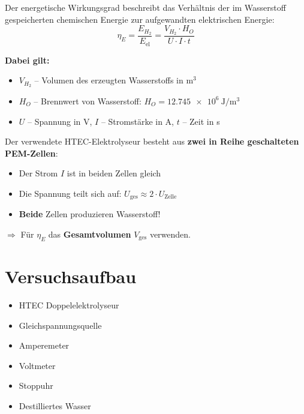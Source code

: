 \documentclass[11pt,a4paper]{scrartcl}
\begin{document}
	\begin{formelbox}[title={\faIcon{square-root-alt} Energetischer Wirkungsgrad $\eta_E$}]
		Der energetische Wirkungsgrad beschreibt das Verhältnis der im Wasserstoff gespeicherten chemischen Energie zur aufgewandten elektrischen Energie:
		\[\eta_E = \frac{E_{H_2}}{E_{\text{el}}} = \frac{V_{H_2} \cdot H_O}{U \cdot I \cdot t}\]
		
		\textbf{Dabei gilt:}
		\begin{itemize}
			\item $V_{H_2}$ -- Volumen des erzeugten Wasserstoffs in m$^3$
			\item $H_O$ -- Brennwert von Wasserstoff: $H_O = \SI{12,745e6}{\joule\per\cubic\metre}$
			\item $U$ -- Spannung in V, \quad $I$ -- Stromstärke in A, \quad $t$ -- Zeit in s
		\end{itemize}
	\end{formelbox}
	
	\begin{hilfebox}[title={\faIcon{lightbulb} Hinweis zum Doppelelektrolyseur}]
		Der verwendete HTEC-Elektrolyseur besteht aus \textbf{zwei in Reihe geschalteten PEM-Zellen}:
		\begin{itemize}
			\item Der Strom $I$ ist in beiden Zellen gleich
			\item Die Spannung teilt sich auf: $U_{\text{ges}} \approx 2 \cdot U_{\text{Zelle}}$
			\item \textbf{Beide} Zellen produzieren Wasserstoff!
		\end{itemize}
		
		$\Rightarrow$ Für $\eta_E$ das \textbf{Gesamtvolumen} $V_{\text{ges}}$ verwenden.
	\end{hilfebox}
	
	\section*{Versuchsaufbau}
	
	\begin{materialbox}
		\begin{minipage}{0.48\textwidth}
			\begin{itemize}
				\item HTEC Doppelelektrolyseur
				\item Gleichspannungsquelle
				\item Amperemeter
			\end{itemize}
		\end{minipage}
		\begin{minipage}{0.48\textwidth}
			\begin{itemize}
				\item Voltmeter
				\item Stoppuhr
				\item Destilliertes Wasser
			\end{itemize}
		\end{minipage}
	\end{materialbox}
	
\end{document}
